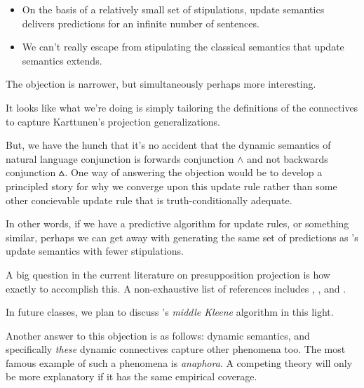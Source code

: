 \documentclass[nols,twoside,nofonts,nobib,nohyper]{tufte-handout}
\theoremstyle{definition}
\begin{document}
\begin{itemize}

    \item On the basis of a relatively small set of stipulations, update semantics delivers predictions for an infinite number of sentences.

    \item We can't really escape from stipulating the classical semantics that update semantics extends.

\end{itemize}

The objection is narrower, but simultaneously perhaps more interesting.


It looks like what we're doing is simply tailoring the definitions of the connectives to capture Karttunen's projection generalizations.

But, we have the hunch that it's no accident that the dynamic semantics of natural language conjunction is forwards conjunction $∧$ and not backwards conjunction $\wedgebar$. One way of answering the objection would be to develop a principled story for why we converge upon this update rule rather than some other concievable update rule that is truth-conditionally adequate.

In other words, if we have a predictive algorithm for update rules, or something similar, perhaps we can get away with generating the same set of predictions as \citeauthor{Heim1983}'s update semantics with fewer stipulations.

A big question in the current literature on presupposition projection is how exactly to accomplish this. A non-exhaustive list of references includes \cite{George2007,George2008,George2014}, \cite{Schlenker2008,Schlenker2009,Schlenker2010}, and \cite{Fox2013}.

In future classes, we plan to discuss \citeauthor{George2007}'s \textit{middle Kleene} algorithm in this light.

Another answer to this objection is as follows: dynamic semantics, and specifically \textit{these} dynamic connectives capture other phenomena too. The most famous example of such a phenomena is \textit{anaphora}. A competing theory will only be more explanatory if it has the same empirical coverage.
\end{document}
